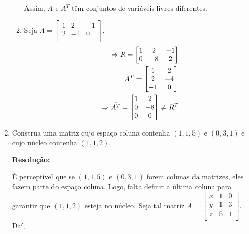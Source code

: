 \documentclass[leqno]{article}
\begin{document}
\begin{enumerate}
\begin{enumerate}
        Assim, $A$ e $A^T$ têm conjuntos de variáveis livres diferentes.
        
        \item Seja $A=\begin{bmatrix}
        1 & 2 & -1\\
        2 & -4 & 0\\
        \end{bmatrix}$.
        \begin{align*}
            \Rightarrow R=\begin{bmatrix}
            1 & 2 & -1\\
            0 & -8 & 2\\
            \end{bmatrix}\\
            A^T=\begin{bmatrix}
        1 & 2\\
        2 & -4\\
        -1 & 0\\
        \end{bmatrix}\\
        \Rightarrow \Tilde{A^T}=\begin{bmatrix}
        1 & 2\\
        0 & -8\\
        0 & 0
        \end{bmatrix}\neq R^T
        \end{align*}
    \end{enumerate}
    
    \item Construa uma matriz cujo espaço coluna contenha $(1,1,5)$ e $(0,3,1)$ e cujo núcleo contenha $(1,1,2)$. 
    
    \textbf{Resolução:}
    
    É perceptível que se $(1,1,5)$ e $(0,3,1)$ forem colunas da matrizes, eles fazem parte do espaço coluna. Logo, falta definir a última coluna para garantir que $(1,1,2)$ esteja no núcleo. Seja tal matriz $A=\begin{bmatrix}
    x & 1 & 0\\
    y & 1 & 3\\
    z & 5 & 1\\
    \end{bmatrix}$. Daí,
    

\end{enumerate}
\end{document}

